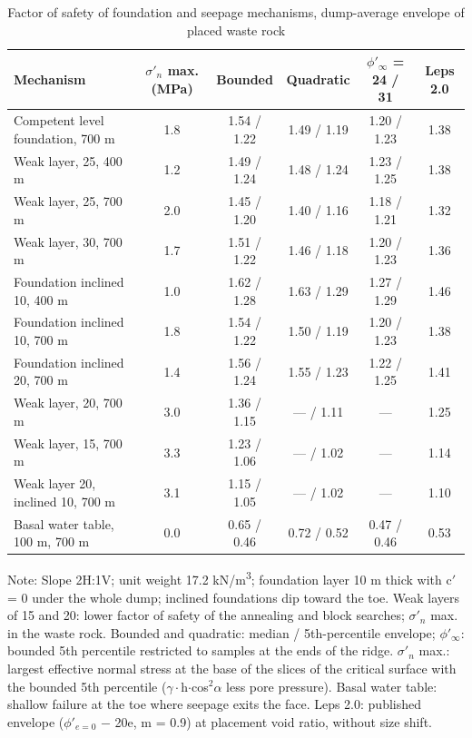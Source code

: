 \documentclass[Journal,letterpaper]{ascelike-new}
\begin{document}
\begin{table}
\caption{Factor of safety of foundation and seepage mechanisms, dump-average envelope of placed waste rock}
\label{tab:4}
\centering\footnotesize
\renewcommand{\arraystretch}{1.15}
\setlength{\tabcolsep}{3pt}
\begin{tabular}{lccccc}
\hline
Mechanism & $\sigma'_n$ max. (MPa) & Bounded & Quadratic & $\phi'_\infty$ = 24\textdegree{} / 31\textdegree{} & Leps 2.0 \\
\hline
Competent level foundation, 700 m & 1.8 & 1.54 / 1.22 & 1.49 / 1.19 & 1.20 / 1.23 & 1.38 \\
Weak layer, 25\textdegree{}, 400 m & 1.2 & 1.49 / 1.24 & 1.48 / 1.24 & 1.23 / 1.25 & 1.38 \\
Weak layer, 25\textdegree{}, 700 m & 2.0 & 1.45 / 1.20 & 1.40 / 1.16 & 1.18 / 1.21 & 1.32 \\
Weak layer, 30\textdegree{}, 700 m & 1.7 & 1.51 / 1.22 & 1.46 / 1.18 & 1.20 / 1.23 & 1.36 \\
Foundation inclined 10\textdegree{}, 400 m & 1.0 & 1.62 / 1.28 & 1.63 / 1.29 & 1.27 / 1.29 & 1.46 \\
Foundation inclined 10\textdegree{}, 700 m & 1.8 & 1.54 / 1.22 & 1.50 / 1.19 & 1.20 / 1.23 & 1.38 \\
Foundation inclined 20\textdegree{}, 700 m & 1.4 & 1.56 / 1.24 & 1.55 / 1.23 & 1.22 / 1.25 & 1.41 \\
Weak layer, 20\textdegree{}, 700 m & 3.0 & 1.36 / 1.15 & --- / 1.11 & --- & 1.25 \\
Weak layer, 15\textdegree{}, 700 m & 3.3 & 1.23 / 1.06 & --- / 1.02 & --- & 1.14 \\
Weak layer 20\textdegree{}, inclined 10\textdegree{}, 700 m & 3.1 & 1.15 / 1.05 & --- / 1.02 & --- & 1.10 \\
Basal water table, 100 m, 700 m & 0.0 & 0.65 / 0.46 & 0.72 / 0.52 & 0.47 / 0.46 & 0.53 \\
\hline
\end{tabular}
\par\vspace{4pt}\parbox{\linewidth}{\footnotesize Note: Slope 2H:1V; unit weight 17.2 kN/m\textsuperscript{3}; foundation layer 10 m thick with c$'$ = 0 under the whole dump; inclined foundations dip toward the toe. Weak layers of 15\textdegree{} and 20\textdegree{}: lower factor of safety of the annealing and block searches; $\sigma'_n$ max. in the waste rock. Bounded and quadratic: median / 5th-percentile envelope; $\phi'_\infty$: bounded 5th percentile restricted to samples at the ends of the ridge. $\sigma'_n$ max.: largest effective normal stress at the base of the slices of the critical surface with the bounded 5th percentile ($\gamma\cdot$h$\cdot$cos$^{2}\alpha$ less pore pressure). Basal water table: shallow failure at the toe where seepage exits the face. Leps 2.0: published envelope ($\phi'_{e=0}$ $-$ 20e, m = 0.9) at placement void ratio, without size shift.}
\end{table}
\end{document}
